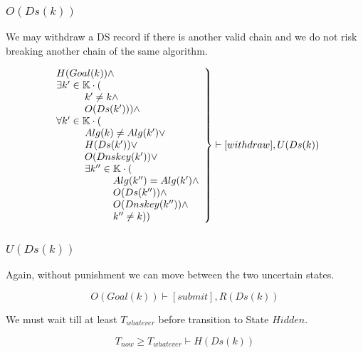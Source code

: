 \documentclass[twoside,english, a4paper]{article}
\newcommand{\mathbox}[1]{#1}
\begin{document}
\subsubsection{$O(Ds(k))$}

\mathbox{

	We may withdraw a DS record if there is another valid chain and
	we do not risk breaking another chain of the same algorithm.

	\begin{equation}
		\left.
		\begin{array}{l}
\hskip 0cm			H(Goal(k)) \wedge \\
\hskip 0cm			\exists k' \in \mathbb{K} \cdot (\\
\hskip 1cm				k' \neq k \wedge \\
\hskip 1cm				O(Ds(k'))) \wedge \\
\hskip 0cm				\forall k' \in \mathbb{K} \cdot ( \\
\hskip 1cm					Alg(k) \neq Alg(k') \vee \\
\hskip 1cm					H(Ds(k')) \vee \\
\hskip 1cm					O(Dnskey(k')) \vee \\
\hskip 1cm					\exists k'' \in \mathbb{K} \cdot (\\
\hskip 2cm 						Alg(k'')=Alg(k') \wedge \\
\hskip 2cm 						O(Ds(k'')) \wedge \\
\hskip 2cm 						O(Dnskey(k'')) \wedge \\
\hskip 2cm 						k'' \neq k))
		\end{array}
		\right\} \vdash [withdraw], U(Ds(k)) \\
	\end{equation}
}

\subsubsection{$U(Ds(k))$}

\mathbox{

	Again, without punishment we can move between the two uncertain 
	states.

	\begin{equation}
			O(Goal(k)) \vdash [submit], R(Ds(k)) 
	\end{equation}

	We must wait till at least $T_{whatever}$ before transition to State 
	$Hidden$.
	
	\begin{equation}
			T_{now} \geq T_{whatever} \vdash H(Ds(k))
	\end{equation}
}
\end{document}
